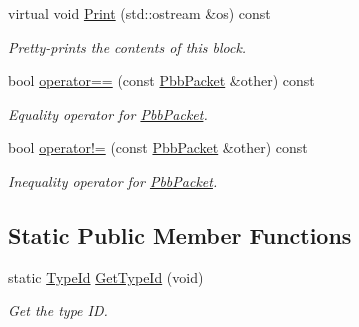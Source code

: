 \begin{DoxyCompactItemize}
virtual void \hyperlink{classns3_1_1PbbPacket_a9069082ecd33f0f95275a817bf63e230}{Print} (std\+::ostream \&os) const 
\begin{DoxyCompactList}\small\item\em Pretty-\/prints the contents of this block. \end{DoxyCompactList}\item 
bool \hyperlink{classns3_1_1PbbPacket_ac1dd3ea429e508347e2b7624ed03387d}{operator==} (const \hyperlink{classns3_1_1PbbPacket}{Pbb\+Packet} \&other) const 
\begin{DoxyCompactList}\small\item\em Equality operator for \hyperlink{classns3_1_1PbbPacket}{Pbb\+Packet}. \end{DoxyCompactList}\item 
bool \hyperlink{classns3_1_1PbbPacket_a1e7a77f5b2cb6fd926083a304f262b62}{operator!=} (const \hyperlink{classns3_1_1PbbPacket}{Pbb\+Packet} \&other) const 
\begin{DoxyCompactList}\small\item\em Inequality operator for \hyperlink{classns3_1_1PbbPacket}{Pbb\+Packet}. \end{DoxyCompactList}\end{DoxyCompactItemize}
\subsection*{Static Public Member Functions}
\begin{DoxyCompactItemize}
\item 
static \hyperlink{classns3_1_1TypeId}{Type\+Id} \hyperlink{classns3_1_1PbbPacket_ac0b3d5c555da4aa6fce18a3185ea1f86}{Get\+Type\+Id} (void)
\begin{DoxyCompactList}\small\item\em Get the type ID. \end{DoxyCompactList}\end{DoxyCompactItemize}
